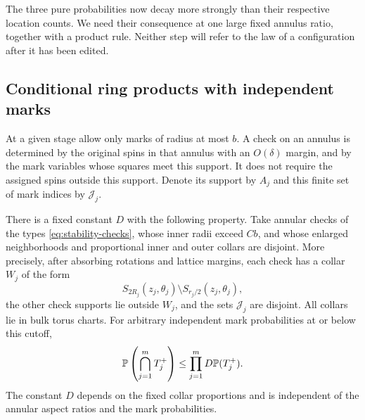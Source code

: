 The three pure probabilities now decay more strongly than their
respective location counts.  We need their consequence at one large
fixed annulus ratio, together with a product rule.  Neither step will
refer to the law of a configuration after it has been edited.

\subsection{Conditional ring products with independent marks}

At a given stage allow only marks of radius at most $b$.  A check on
an annulus is determined by the original spins in that annulus with
an $O(\delta)$ margin, and by the mark variables whose squares meet
this support.  It does not require the assigned spins outside this
support.  Denote its support by $A_j$ and this finite set of mark
indices by $\mathcal J_j$.

\begin{lemma}
\label{lem:stability-products}
There is a fixed constant $D$ with the following property.  Take
annular checks of the types \eqref{eq:stability-checks}, whose inner
radii exceed $C b$, and whose enlarged neighborhoods and
proportional inner and outer collars are disjoint.  More precisely,
after absorbing rotations and lattice margins, each check has a
collar $W_j$ of the form
\[
 S_{2R_j}(z_j,\theta_j)\setminus
       S_{r_j/2}(z_j,\theta_j),
\]
the other check supports lie outside $W_j$, and the sets
$\mathcal J_j$ are disjoint.  All collars lie in bulk torus charts.
For arbitrary independent mark probabilities at or below this
cutoff,
\begin{equation}
 \P\left(\bigcap_{j=1}^m T_j^+\right)
       \leq\prod_{j=1}^m D\P(T_j^+).
 \label{eq:stability-product}
\end{equation}
The constant $D$ depends on the fixed collar proportions and is
independent of the annular aspect ratios and the mark probabilities.
\end{lemma}

